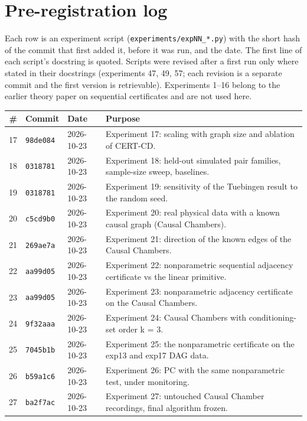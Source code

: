 \appendix

\section{Pre-registration log}\label{app:prereg}
Each row is an experiment script (\texttt{experiments/expNN\_*.py}) with the short hash of the commit that first added it, before it was run, and the date. The first line of each script's docstring is quoted. Scripts were revised after a first run only where stated in their docstrings (experiments 47, 49, 57; each revision is a separate commit and the first version is retrievable). Experiments 1--16 belong to the earlier theory paper on sequential certificates and are not used here.
\begingroup\scriptsize\setlength{\tabcolsep}{3pt}
\begin{longtable}{@{}rllp{9.8cm}@{}}
\toprule
\# & Commit & Date & Purpose\\
\midrule
\endhead
17 & \texttt{98de084} & 2026-10-23 & Experiment 17: scaling with graph size and ablation of CERT-CD.\\
18 & \texttt{0318781} & 2026-10-23 & Experiment 18: held-out simulated pair families, sample-size sweep, baselines.\\
19 & \texttt{0318781} & 2026-10-23 & Experiment 19: sensitivity of the Tuebingen result to the random seed.\\
20 & \texttt{c5cd9b0} & 2026-10-23 & Experiment 20: real physical data with a known causal graph (Causal Chambers).\\
21 & \texttt{269ae7a} & 2026-10-23 & Experiment 21: direction of the known edges of the Causal Chambers.\\
22 & \texttt{aa99d05} & 2026-10-23 & Experiment 22: nonparametric sequential adjacency certificate vs the linear primitive.\\
23 & \texttt{aa99d05} & 2026-10-23 & Experiment 23: nonparametric adjacency certificate on the Causal Chambers.\\
24 & \texttt{9f32aaa} & 2026-10-23 & Experiment 24: Causal Chambers with conditioning-set order k = 3.\\
25 & \texttt{7045b1b} & 2026-10-23 & Experiment 25: the nonparametric certificate on the exp13 and exp17 DAG data.\\
26 & \texttt{b59a1c6} & 2026-10-23 & Experiment 26: PC with the same nonparametric test, under monitoring.\\
27 & \texttt{ba2f7ac} & 2026-10-23 & Experiment 27: untouched Causal Chamber recordings, final algorithm frozen.\\

\end{longtable}
